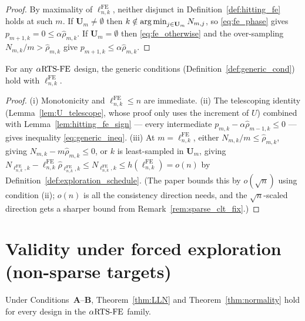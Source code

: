 \begin{proof}
By maximality of $\ell_{n,k}^{\mathrm{FE}}$, neither disjunct in
Definition~\ref{def:hitting_fe} holds at such $m$. If $\mathbf{U}_m\ne\emptyset$
then $k\notin\operatorname*{arg\,min}_{j\in\mathbf{U}_m}N_{m,j}$, so \eqref{eq:fe_phase} gives
$p_{m+1,k}=0\le\alpha\hat{\rho}_{m,k}$. If $\mathbf{U}_m=\emptyset$ then
\eqref{eq:fe_otherwise} and the over-sampling $N_{m,k}/m>\hat{\rho}_{m,k}$ give
$p_{m+1,k}\le\alpha\hat{\rho}_{m,k}$.
\end{proof}

\begin{lemma}\label{lem:preliminary_fe}
\leanok
{}
For any $\alpha\text{RTS-FE}$ design, the generic conditions
(Definition~\ref{def:generic_cond}) hold with $\ell_{n,k}^{\mathrm{FE}}$.
\end{lemma}

\begin{proof}
(i) Monotonicity and $\ell_{n,k}^{\mathrm{FE}}\le n$ are immediate. (ii) The
telescoping identity (Lemma~\ref{lem:U_telescope}, whose proof only uses the
increment of $U$) combined with Lemma~\ref{lem:hitting_fe_sign} — every
intermediate $p_{m,k}-\alpha\hat{\rho}_{m-1,k}\le0$ — gives inequality
\eqref{eq:generic_ineq}. (iii) At $m=\ell_{n,k}^{\mathrm{FE}}$, either
$N_{m,k}/m\le\hat{\rho}_{m,k}$, giving $N_{m,k}-m\hat{\rho}_{m,k}\le0$, or $k$ is
least-sampled in $\mathbf{U}_m$, giving
$N_{\ell_{n,k}^{\mathrm{FE}},k}-\ell_{n,k}^{\mathrm{FE}}\hat{\rho}_{\ell_{n,k}^{\mathrm{FE}},k}
 \le N_{\ell_{n,k}^{\mathrm{FE}},k}\le h(\ell_{n,k}^{\mathrm{FE}})=o(n)$
by Definition~\ref{def:exploration_schedule}. (The paper bounds this by $o(\sqrt n)$ using
condition (ii); $o(n)$ is all the consistency direction needs, and the $\sqrt n$-scaled direction
gets a sharper bound from Remark~\ref{rem:sparse_clt_fix}.)
\end{proof}

\section{Validity under forced exploration (non-sparse targets)}
\label{sec:forced_nonsparse}

\begin{theorem}\label{thm:forced_valid}
\leanok
{}
Under Conditions~\textbf{A}--\textbf{B}, Theorem~\ref{thm:LLN} and
Theorem~\ref{thm:normality} hold for every design in the $\alpha\text{RTS-FE}$ family.
\end{theorem}

